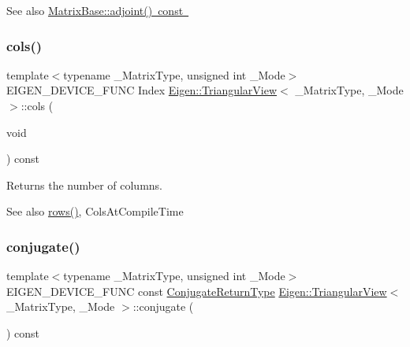 \begin{DoxySeeAlso}{See also}
\mbox{\hyperlink{class_eigen_1_1_matrix_base_afacca1f88da57e5cd87dd07c8ff926bb}{Matrix\+Base\+::adjoint() const }} 
\end{DoxySeeAlso}
\mbox{\label{class_eigen_1_1_triangular_view_ae0a22563fd472eca7aaf9bc5f29d2898}} 
\subsubsection{\texorpdfstring{cols()}{cols()}}
{\footnotesize\ttfamily template$<$typename \+\_\+\+Matrix\+Type, unsigned int \+\_\+\+Mode$>$ \\
E\+I\+G\+E\+N\+\_\+\+D\+E\+V\+I\+C\+E\+\_\+\+F\+U\+NC Index \mbox{\hyperlink{class_eigen_1_1_triangular_view}{Eigen\+::\+Triangular\+View}}$<$ \+\_\+\+Matrix\+Type, \+\_\+\+Mode $>$\+::cols (\begin{DoxyParamCaption}\item[{void}]{ }\end{DoxyParamCaption}) const\hspace{0.3cm}{\ttfamily [inline]}}





\begin{DoxyReturn}{Returns}
the number of columns. 
\end{DoxyReturn}
\begin{DoxySeeAlso}{See also}
\mbox{\hyperlink{class_eigen_1_1_triangular_view_a34de9aa9961062ff65f24bbeaef4e693}{rows()}}, Cols\+At\+Compile\+Time 
\end{DoxySeeAlso}
\mbox{\label{class_eigen_1_1_triangular_view_ae89c798826157831a2b1142d57f04405}} 
\subsubsection{\texorpdfstring{conjugate()}{conjugate()}}
{\footnotesize\ttfamily template$<$typename \+\_\+\+Matrix\+Type, unsigned int \+\_\+\+Mode$>$ \\
E\+I\+G\+E\+N\+\_\+\+D\+E\+V\+I\+C\+E\+\_\+\+F\+U\+NC const \mbox{\hyperlink{class_eigen_1_1_triangular_view}{Conjugate\+Return\+Type}} \mbox{\hyperlink{class_eigen_1_1_triangular_view}{Eigen\+::\+Triangular\+View}}$<$ \+\_\+\+Matrix\+Type, \+\_\+\+Mode $>$\+::conjugate (\begin{DoxyParamCaption}{ }\end{DoxyParamCaption}) const\hspace{0.3cm}{\ttfamily [inline]}}

